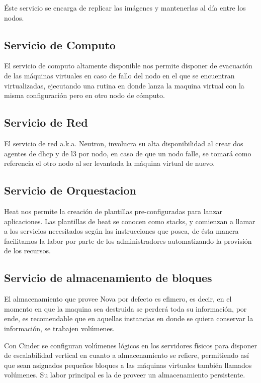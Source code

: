     Éste servicio se encarga de replicar las imágenes y mantenerlas al día entre los nodos.
    
    \subsection{Servicio de Computo}
    
    El servicio de computo altamente disponible nos permite disponer de evacuación de las máquinas virtuales en caso de fallo del nodo en el que se encuentran virtualizadas, ejecutando una rutina en donde lanza la maquina virtual con la misma configuración pero en otro nodo de cómputo.
    
    \subsection{Servicio de Red}
    
    El servicio de red a.k.a. Neutron, involucra su alta disponibilidad al crear dos agentes de dhcp y de l3 por nodo, en caso de que un nodo falle, se tomará como referencia el otro nodo al ser levantada la máquina virtual de nuevo.
      
    \subsection{Servicio de Orquestacion}
     
     Heat nos permite la creación de plantillas pre-configuradas para lanzar aplicaciones. Las plantillas de heat se conocen como stacks, y comienzan a llamar a los servicios necesitados según las instrucciones que posea, de ésta manera facilitamos la labor por parte de los administradores automatizando la provisión de los recursos.
     
     
     
    \subsection{Servicio de almacenamiento de bloques}
    
    El almacenamiento que provee Nova por defecto es efimero, es decir, en el momento en que la maquina sea destruida se perderá toda su información, por ende, es recomendable que en aquellas instancias en donde se quiera conservar la información, se trabajen volúmenes.
    
    Con Cinder se configuran volúmenes lógicos en los servidores físicos para disponer de escalabilidad vertical en cuanto a almacenamiento se refiere, permitiendo así que sean asignados pequeños bloques a las máquinas virtuales también llamados volúmenes. Su labor principal es la de proveer un almacenamiento persistente.
    
